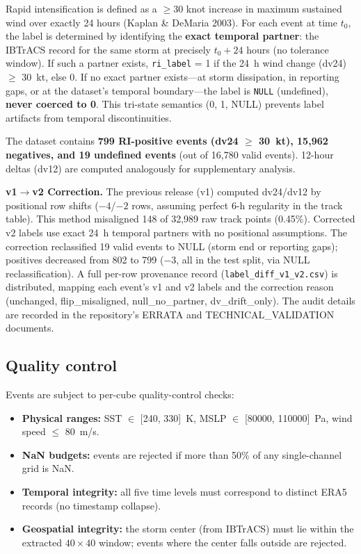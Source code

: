 \documentclass[11pt]{article}
\begin{document}
Rapid intensification is defined as a $\geq$30 knot increase in maximum
sustained wind over exactly 24 hours (Kaplan \& DeMaria 2003). For each event
at time $t_0$, the label is determined by identifying the \textbf{exact
temporal partner}: the IBTrACS record for the same storm at precisely $t_0 +
24$ hours (no tolerance window). If such a partner exists, \texttt{ri\_label}
= 1 if the 24~h wind change (dv24) $\geq$ 30~kt, else 0. If no exact partner
exists---at storm dissipation, in reporting gaps, or at the dataset's temporal
boundary---the label is \texttt{NULL} (undefined), \textbf{never coerced to
0}. This tri-state semantics (0, 1, NULL) prevents label artifacts from
temporal discontinuities.

The dataset contains \textbf{799 RI-positive events (dv24 $\geq$ 30~kt),
15{,}962 negatives, and 19 undefined events} (out of 16{,}780 valid events).
12-hour deltas (dv12) are computed analogously for supplementary analysis.

\textbf{v1$\to$v2 Correction.} The previous release (v1) computed dv24/dv12 by
positional row shifts ($-4$/$-2$ rows, assuming perfect 6-h regularity in the
track table). This method misaligned 148 of 32{,}989 raw track points (0.45\%).
Corrected v2 labels use exact 24~h temporal partners with no positional
assumptions. The correction reclassified 19 valid events to NULL (storm end or
reporting gaps); positives decreased from 802 to 799 ($-3$, all in the test
split, via NULL reclassification). A full per-row provenance record
(\texttt{label\_diff\_v1\_v2.csv}) is distributed, mapping each event's v1 and
v2 labels and the correction reason (unchanged, flip\_misaligned,
null\_no\_partner, dv\_drift\_only). The audit details are recorded in the
repository's ERRATA and TECHNICAL\_VALIDATION documents.

\subsection{Quality control}

Events are subject to per-cube quality-control checks:
\begin{itemize}
  \item \textbf{Physical ranges:} SST $\in$ [240, 330]~K, MSLP $\in$ [80000,
  110000]~Pa, wind speed $\leq$ 80~m/s.
  \item \textbf{NaN budgets:} events are rejected if more than 50\% of any
  single-channel grid is NaN.
  \item \textbf{Temporal integrity:} all five time levels must correspond to
  distinct ERA5 records (no timestamp collapse).
  \item \textbf{Geospatial integrity:} the storm center (from IBTrACS) must
  lie within the extracted $40\times40$ window; events where the center falls
  outside are rejected.
\end{itemize}
\end{document}
